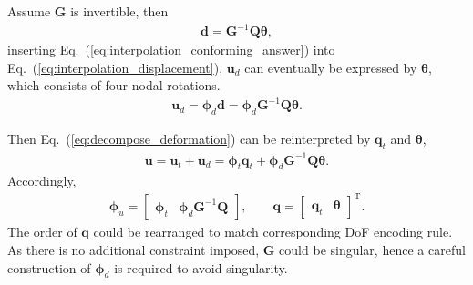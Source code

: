 \documentclass[3p,sort&compress,review,11pt]{elsarticle}
\newcommand*{\mT}{\mathrm{T}}
\newcommand*{\eqsref}[1]{Eq.~(\ref{#1})}
\begin{document}
Assume $\mathbold{G}$ is invertible, then
\begin{gather}\label{eq:interpolation_conforming_answer}
\mathbold{d}=\mathbold{G}^{-1}\mathbold{Q}\mathbold{\theta},
\end{gather}
inserting \eqsref{eq:interpolation_conforming_answer} into \eqsref{eq:interpolation_displacement}, $\mathbold{u}_d$ can eventually be expressed by $\mathbold{\theta}$, which consists of four nodal rotations.
\begin{gather}
\mathbold{u}_d=\mathbold{\phi}_d\mathbold{d}=\mathbold{\phi}_d\mathbold{G}^{-1}\mathbold{Q}\mathbold{\theta}.
\end{gather}

Then \eqsref{eq:decompose_deformation} can be reinterpreted by $\mathbold{q}_t$ and $\mathbold{\theta}$,
\begin{gather}
\mathbold{u}=\mathbold{u}_t+\mathbold{u}_d=\mathbold{\phi}_t\mathbold{q}_t+\mathbold{\phi}_d\mathbold{G}^{-1}\mathbold{Q}\mathbold{\theta}.
\end{gather}
Accordingly,
\begin{gather*}
\mathbold{\phi}_u=\begin{bmatrix}
\mathbold{\phi}_t&\mathbold{\phi}_d\mathbold{G}^{-1}\mathbold{Q}
\end{bmatrix},\qquad
\mathbold{q}=\begin{bmatrix}
\mathbold{q}_t&\mathbold{\theta}
\end{bmatrix}^\mT.
\end{gather*}
The order of $\mathbold{q}$ could be rearranged to match corresponding DoF encoding rule. As there is no additional constraint imposed, $\mathbold{G}$ could be singular, hence a careful construction of $\mathbold{\phi}_d$ is required to avoid singularity.
\end{document}
